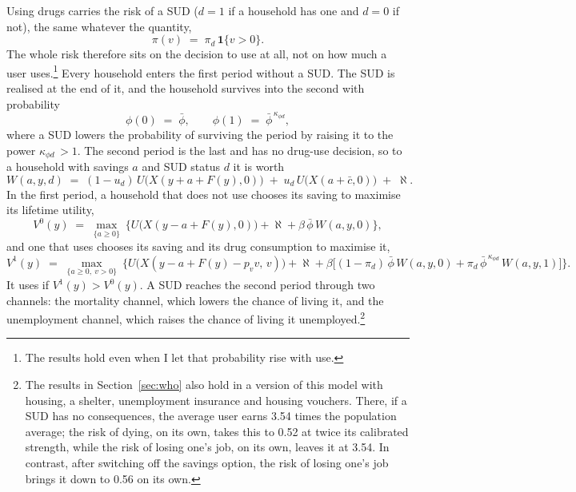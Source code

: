 \documentclass[10pt]{article}
\begin{document}
Using drugs carries the risk of a SUD ($d=1$ if a household has one and $d=0$ if not), the same whatever the quantity,
\begin{equation}\label{eq:hazard}
\pi(v) \;=\; \pi_d\,\mathbf{1}\{v>0\}.
\end{equation}
The whole risk therefore sits on the decision to use
at all, not on how much a user uses.\footnote{The results hold even when I let that probability rise with use.} Every household enters the first period without a SUD. The SUD is realised at the end of it, and the household survives into the second with probability
\begin{equation}\label{eq:surv}
\phi(0) \;=\; \bar\phi, \qquad \phi(1) \;=\; \bar\phi^{\,\kappa_{\phi d}},
\end{equation}
where a SUD lowers the probability of surviving the period by raising it to the power $\kappa_{\phi d}$$\,>1$. The second period is the last and has no drug-use decision, so to a household with savings $a$ and SUD status $d$ it is worth
\begin{equation}\label{eq:w2}
W(a,y,d) \;=\; (1-u_d)\,U\big(X(y+a+F(y),0)\big)\;+\;u_d\,U\big(X(a+\bar c,0)\big)\;+\;\aleph.
\end{equation}
In the first period, a household that does not use chooses its saving to maximise its lifetime utility,
\begin{equation}\label{eq:v0}
V^0(y) \;=\; \max_{\{a\ge0\}}\ \Big\{U\big(X(y-a+F(y),0)\big)+\aleph+\beta\,\bar\phi\,W(a,y,0)\Big\},
\end{equation}
and one that uses chooses its saving and its drug consumption to maximise it,
\begin{equation}\label{eq:v1}
V^1(y) \;=\; \max_{\{a\ge0,\ v>0\}}\ \Big\{U\big(X(y-a+F(y)-p_v v,\,v)\big)+\aleph+\beta\Big[(1-\pi_d)\,\bar\phi\,W(a,y,0)+\pi_d\,\bar\phi^{\,\kappa_{\phi d}}\,W(a,y,1)\Big]\Big\}.
\end{equation}
It uses if $V^1(y)>V^0(y)$. A SUD reaches the second period through two channels: the mortality channel, which lowers the chance of living it, and the unemployment channel, which raises the chance of living it unemployed.\footnote{The results in Section~\ref{sec:who} also hold in a version of this model with housing, a shelter, unemployment insurance and housing vouchers. There, if a SUD has no consequences, the average user earns 3.54 times the population average; the risk of dying, on its own, takes this to 0.52 at twice its calibrated strength, while the risk of losing one's job, on its own, leaves it at 3.54.   In contrast, after switching off the savings option, the risk of losing one's job brings it down to 0.56 on its own.}
\end{document}
